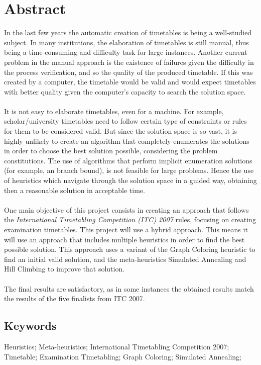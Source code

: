 \chapter*{Abstract}

In the last few years the automatic creation of timetables is being a well-studied subject. In many institutions, the elaboration of timetables is still manual, thus being a time-consuming and difficulty task for large instances. Another current problem in the manual approach is the existence of failures given the difficulty in the process verification, and so the quality of the produced timetable. If this was created by a computer, the timetable would be valid and would expect timetables with better quality given the computer's capacity to search the solution space. \\
\\
It is not easy to elaborate timetables, even for a machine. For example, scholar/university timetables need to follow certain type of constraints or rules for them to be considered valid. But since the solution space is so vast, it is highly unlikely to create an algorithm that completely enumerates the solutions in order to choose the best solution possible, considering the problem constitutions. The use of algorithms that perform implicit enumeration solutions (for example, an branch bound), is not feasible for large problems. Hence the use of heuristics which navigate through the solution space in a guided way, obtaining then a reasonable solution in acceptable time.\\
\\
One main objective of this project consists in creating an approach that follows the \textit{International Timetabling Competition (ITC) 2007} rules, focusing on creating examination timetables. This project will use a hybrid approach. This means it will use an approach that includes multiple heuristics in order to find the best possible solution. This approach uses a variant of the Graph Coloring heuristic to find an initial valid solution, and the meta-heuristics Simulated Annealing and Hill Climbing to improve that solution.\\
\\
The final results are satisfactory, as in some instances the obtained results match the results of the five finalists from ITC 2007.


\section*{Keywords}

Heuristics; Meta-heuristics; International Timetabling Competition 2007; Timetable; Examination Timetabling; Graph Coloring; Simulated Annealing;

